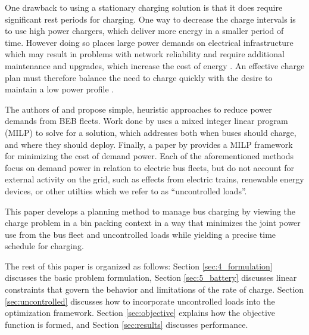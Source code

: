 \par One drawback to using a stationary charging solution is that it does require significant rest periods for charging. One way to decrease the charge intervals is to use high power chargers, which deliver more energy in a smaller period of time. However doing so places large power demands on electrical infrastructure \cite{stahleder_impact_2019} which may result in problems with network reliability \cite{deb_impact_2017} and require additional maintenance and upgrades, which increase the cost of energy \cite{boonraksa_impact_2019}. An effective charge plan must therefore balance the need to charge quickly with the desire to maintain a low power profile \cite{ojer_development_2020}.
\par The authors of \cite{qin_numerical_2016} and \cite{Wang2019} propose simple, heuristic approaches to reduce power demands from BEB fleets. Work done by \cite{bagherinezhad_spatio-temporal_2020} uses a mixed integer linear program (MILP) to solve for a solution, which addresses both when buses should charge, and where they should deploy. Finally, a paper by \cite{He_2019_Fast} provides a MILP framework for minimizing the cost of demand power. Each of the aforementioned methods focus on demand power in relation to electric bus fleets, but do not account for external activity on the grid, such as effects from electric trains, renewable energy devices, or other utilties which we refer to as ``uncontrolled loads''.  
\par This paper develops a planning method to manage bus charging by viewing the charge problem in a bin packing context \cite{Ma_Mixed-integer_2017} in a way that minimizes the joint power use from the bus fleet and uncontrolled loads while yielding a precise time schedule for charging.
\par The rest of this paper is organized as follows: Section \ref{sec:4_formulation} discusses the basic problem formulation, Section \ref{sec:5_battery} discusses linear constraints that govern the behavior and limitations of the rate of charge. Section \ref{sec:uncontrolled} discusses how to incorporate uncontrolled loads into the optimization framework. Section \ref{sec:objective} explains how the objective function is formed, and Section \ref{sec:results} discusses performance.
